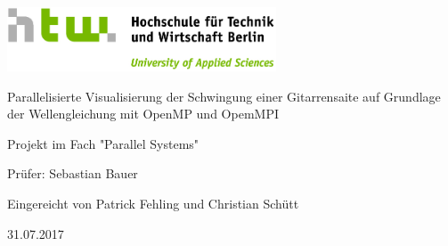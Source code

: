 \documentclass[12pt,a4paper,ngerman]{article}
\begin{document}
\begin{titlepage}
\thispagestyle{empty}

\begin{center}
	\includegraphics[width=0.6\textwidth]{pictures/HTW_Logo}
	
	\vspace{2cm}
	
	\Huge 
	Parallelisierte Visualisierung der Schwingung einer Gitarrensaite auf Grundlage der Wellengleichung mit OpenMP und OpemMPI
	
	\vspace{2cm}
	\large
	Projekt im Fach "Parallel Systems"
	
	\vspace{2cm}
	
	Prüfer: Sebastian Bauer
	
	\vspace{0.5cm}
	
	Eingereicht von Patrick Fehling und Christian Schütt
	
	\vspace{0.5cm}
	
	31.07.2017
\end{center}


\end{titlepage}

\pagestyle{empty}

\tableofcontents
\setcounter{page}{0}

\clearpage{}
\pagestyle{fancy}









\end{document}

